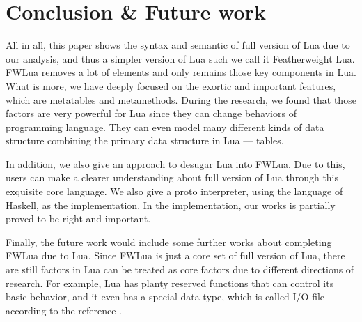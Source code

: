 \chapter{Conclusion \& Future work}
All in all, this paper shows the syntax and semantic of full version of Lua due to our analysis, and thus a simpler version of Lua such we call it Featherweight Lua. FWLua removes a lot of elements and only remains those key components in Lua. What is more, we have deeply focused on the exortic and important features, which are metatables and metamethods. During the research, we found that those factors are very powerful for Lua since they can change behaviors of programming language. They can even model many different kinds of data structure combining the primary data structure in Lua --- tables.

In addition, we also give an approach to desugar Lua into FWLua. Due to this, users can make a clearer understanding about full version of Lua through this exquisite core language. We also give a proto interpreter, using the language of Haskell, as the implementation. In the implementation, our works is partially proved to be right and important.

Finally, the future work would include some further works about completing FWLua due to Lua. Since FWLua is just a core set of full version of Lua, there are still factors in Lua can be treated as core factors due to different directions of research. For example, Lua has planty reserved functions that can control its basic behavior, and it even has a special data type, which is called I/O file according to the reference \cite{PIL}.